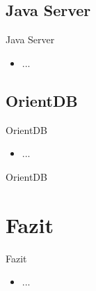 \documentclass[aspectratio=169]{beamer}
\begin{document}
\subsection{Java Server}

\begin{frame}{Java Server}
  \begin{itemize}
  	\item ...
  \end{itemize}
\end{frame}

\subsection{OrientDB}

\begin{frame}{OrientDB}
  \begin{itemize}
  	\item ...
  \end{itemize}
\end{frame}

\begin{frame}{OrientDB}
\end{frame}

\section{Fazit}

\begin{frame}{Fazit}
  \begin{itemize}
  	\item ...
  \end{itemize}
\end{frame}
\end{document}

